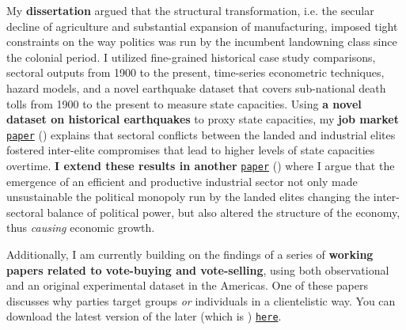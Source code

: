 \documentclass[10pt,stdletter,dateno,sigleft]{newlfm} %
\begin{document}
\begin{newlfm}
My {\bf dissertation} argued that the structural transformation, i.e. the secular decline of agriculture and substantial expansion of manufacturing, imposed tight constraints on the way politics was run by the incumbent landowning class since the colonial period. I utilized fine-grained historical case study comparisons, sectoral outputs from 1900 to the present, time-series econometric techniques, hazard models, and a novel earthquake dataset that covers sub-national death tolls from 1900 to the present to measure state capacities. Using {\bf a novel dataset on historical earthquakes} to proxy state capacities, my {\bf job market} \href{https://github.com/hbahamonde/Earthquake_Paper/raw/master/Bahamonde_Earthquake_Paper.pdf}{\texttt{paper}} (\emph{\unskip}) explains that sectoral conflicts between the landed and industrial elites fostered inter-elite compromises that lead to higher levels of state capacities overtime. {\bf I extend these results in another} \href{https://github.com/hbahamonde/Negative_Link_Paper/raw/master/Bahamonde_NegativeLink.pdf}{\texttt{paper}} (\emph{\unskip}) where I argue that the emergence of an efficient and productive industrial sector not only made unsustainable the political monopoly run by the landed elites changing the inter-sectoral balance of political power, but also altered the structure of the economy, thus \emph{causing} economic growth. 


Additionally, I am currently building on the findings of a series of {\bf working papers related to vote-buying and vote-selling}, using both observational and an original experimental dataset in the Americas. One of these papers discusses why parties target groups \emph{or} individuals in a clientelistic way. You can download the latest version of the later (which is \emph{\unskip}) \href{https://github.com/hbahamonde/Clientelism_paper/raw/master/Bahamonde_Clientelism_Paper.pdf}{\texttt{here}}. 



{\unskip}




\end{newlfm}
\end{document}
